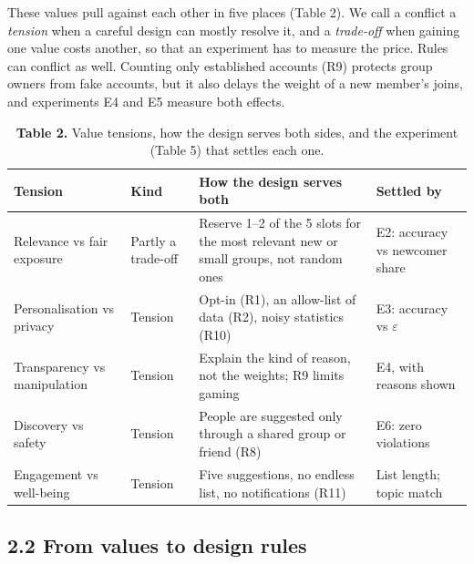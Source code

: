 \documentclass[11pt,letterpaper]{article}
\newcommand{\rowrule}{\midrule[0.2pt]}
\begin{document}
These values pull against each other in five places (Table 2). We call a conflict a \textit{tension} when a
careful design can mostly resolve it, and a \textit{trade-off} when gaining one value costs another, so that
an experiment has to measure the price. Rules can conflict as well. Counting only established accounts (R9)
protects group owners from fake accounts, but it also delays the weight of a new member's joins, and
experiments E4 and E5 measure both effects.

\begin{table}[!htbp]
\centering
\caption*{\textbf{Table 2.} Value tensions, how the design serves both sides, and the experiment (Table 5)
that settles each one.}
\scriptsize
\begin{tabular}{
  >{\raggedright\arraybackslash}p{}
  >{\raggedright\arraybackslash}p{}
  >{\raggedright\arraybackslash}p{}
  >{\raggedright\arraybackslash}p{}
}
\toprule
\textbf{Tension} & \textbf{Kind} & \textbf{How the design serves both} & \textbf{Settled by} \\
\midrule
Relevance vs fair exposure & Partly a trade-off & Reserve 1--2 of the 5 slots for the most relevant new or small groups, not random ones & E2: accuracy vs newcomer share \\
\rowrule
Personalisation vs privacy & Tension & Opt-in (R1), an allow-list of data (R2), noisy statistics (R10) & E3: accuracy vs $\varepsilon$ \\
\rowrule
Transparency vs manipulation & Tension & Explain the kind of reason, not the weights; R9 limits gaming & E4, with reasons shown \\
\rowrule
Discovery vs safety & Tension & People are suggested only through a shared group or friend (R8) & E6: zero violations \\
\rowrule
Engagement vs well-being & Tension & Five suggestions, no endless list, no notifications (R11) & List length; topic match \\
\bottomrule
\end{tabular}
\end{table}

\subsection{2.2 From values to design rules}
\end{document}
